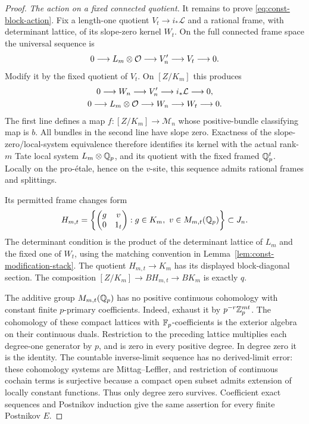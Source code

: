 \begin{proof}
\emph{The action on a fixed connected quotient.}
It remains to prove \eqref{eq:const-block-action}.  Fix a length-one
quotient $V_t\to i_*\mathcal L$ and a rational frame, with determinant
lattice, of its slope-zero kernel $W_t$.  On the full connected frame
space the universal sequence is
\[
 0\longrightarrow L_m\otimes\mathcal O
      \longrightarrow V_n'\longrightarrow V_t\longrightarrow0.
\]
Modify it by the fixed quotient of $V_t$.  On $[Z/K_m]$ this produces
\begin{equation}
 \begin{gathered}
 0\longrightarrow W_n\longrightarrow V_n'
            \longrightarrow i_*\mathcal L\longrightarrow0,\\
 0\longrightarrow L_m\otimes\mathcal O
            \longrightarrow W_n\longrightarrow W_t\longrightarrow0.
 \end{gathered}
 \label{eq:const-modified-extension}
\end{equation}
The first line defines a map $f:[Z/K_m]\to\mathcal M_n$ whose
positive-bundle classifying map is $b$.  All bundles in the second line
have slope zero.  Exactness of the slope-zero/local-system equivalence
therefore identifies its kernel with the actual rank-$m$ Tate local
system $L_m\otimes\mathbb Q_p$, and its quotient with the fixed framed
$\mathbb Q_p^t$.  Locally on the pro-\'{e}tale, hence on the $v$-site, this
sequence admits rational frames and splittings.

Its permitted frame changes form
\begin{equation}
 H_{m,t}=
 \left\{\begin{pmatrix}g&v\\0&1_t\end{pmatrix}:
          g\in K_m,\ v\in M_{m,t}(\mathbb Q_p)\right\}\subset J_n.
 \label{eq:const-upper-block}
\end{equation}
The determinant condition is the product of the determinant lattice of
$L_m$ and the fixed one of $W_t$, using the matching convention in
Lemma~\ref{lem:const-modification-stack}.  The quotient
$H_{m,t}\to K_m$ has its displayed block-diagonal section.  The
composition $[Z/K_m]\to BH_{m,t}\to BK_m$ is exactly $q$.

The additive group $M_{m,t}(\mathbb Q_p)$ has no positive continuous cohomology
with constant finite $p$-primary coefficients.  Indeed, exhaust it by
$p^{-r}\mathbb Z_p^{mt}$.  The cohomology of these compact lattices with
$\mathbb F_p$-coefficients is the exterior algebra on their continuous duals.
Restriction to the preceding lattice multiplies each degree-one
generator by $p$, and is zero in every positive degree.  In degree
zero it is the identity.  The countable inverse-limit sequence has no
derived-limit error: these cohomology systems are Mittag--Leffler, and
restriction of continuous cochain terms is surjective because a
compact open subset admits extension of locally constant functions.
Thus only degree zero survives.  Coefficient exact sequences and
Postnikov induction give the same assertion for every finite
Postnikov $E$.


\end{proof}
